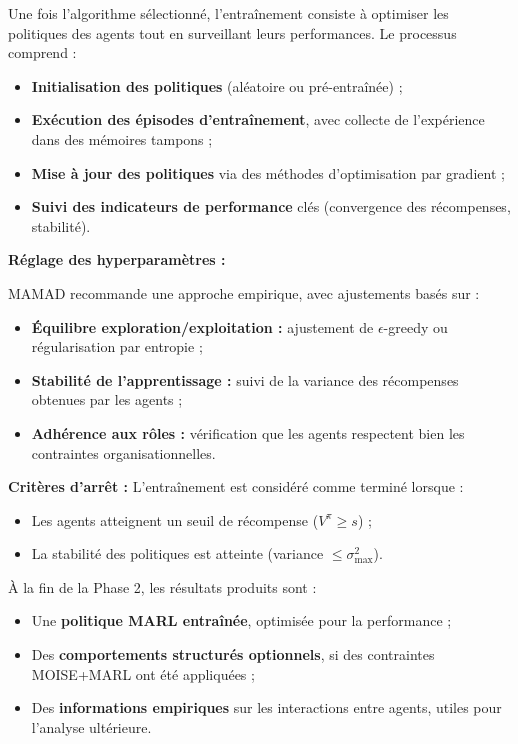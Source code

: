 \documentclass[pdflatex,sn-mathphys-num]{sn-jnl}%
\theoremstyle{thmstyleone}%
\theoremstyle{thmstyletwo}%
\theoremstyle{thmstylethree}%
\begin{document}
Une fois l'algorithme sélectionné, l'entraînement consiste à optimiser les politiques des agents tout en surveillant leurs performances. Le processus comprend :

\begin{itemize}
    \item \textbf{Initialisation des politiques} (aléatoire ou pré-entraînée) ;
    \item \textbf{Exécution des épisodes d'entraînement}, avec collecte de l'expérience dans des mémoires tampons ;
    \item \textbf{Mise à jour des politiques} via des méthodes d'optimisation par gradient ;
    \item \textbf{Suivi des indicateurs de performance} clés (convergence des récompenses, stabilité).
\end{itemize}

\vspace{0.4em}
\noindent \textbf{Réglage des hyperparamètres :}

MAMAD recommande une approche empirique, avec ajustements basés sur :

\begin{itemize}
    \item \textbf{Équilibre exploration/exploitation :} ajustement de $\epsilon$-greedy ou régularisation par entropie ;
    \item \textbf{Stabilité de l'apprentissage :} suivi de la variance des récompenses obtenues par les agents ;
    \item \textbf{Adhérence aux rôles :} vérification que les agents respectent bien les contraintes organisationnelles.
\end{itemize}

\vspace{0.4em}
\noindent \textbf{Critères d'arrêt :}
L'entraînement est considéré comme terminé lorsque :

\begin{itemize}
    \item Les agents atteignent un seuil de récompense ($V^{\pi} \geq s$) ;
    \item La stabilité des politiques est atteinte (variance $\leq \sigma_{\max}^2$).
\end{itemize}

\vspace{0.4em}
\noindent À la fin de la Phase 2, les résultats produits sont :
\begin{itemize}
    \item Une \textbf{politique MARL entraînée}, optimisée pour la performance ;
    \item Des \textbf{comportements structurés optionnels}, si des contraintes MOISE+MARL ont été appliquées ;
    \item Des \textbf{informations empiriques} sur les interactions entre agents, utiles pour l'analyse ultérieure.
\end{itemize}
\end{document}
